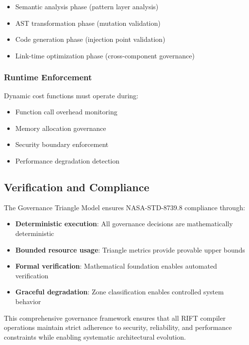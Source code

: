 \begin{itemize}
    \item Semantic analysis phase (pattern layer analysis)
    \item AST transformation phase (mutation validation)
    \item Code generation phase (injection point validation)
    \item Link-time optimization phase (cross-component governance)
\end{itemize}

\subsubsection{Runtime Enforcement}

Dynamic cost functions must operate during:

\begin{itemize}
    \item Function call overhead monitoring
    \item Memory allocation governance
    \item Security boundary enforcement
    \item Performance degradation detection
\end{itemize}

\subsection{Verification and Compliance}

The Governance Triangle Model ensures NASA-STD-8739.8 compliance through:

\begin{itemize}
    \item \textbf{Deterministic execution}: All governance decisions are mathematically deterministic
    \item \textbf{Bounded resource usage}: Triangle metrics provide provable upper bounds
    \item \textbf{Formal verification}: Mathematical foundation enables automated verification
    \item \textbf{Graceful degradation}: Zone classification enables controlled system behavior
\end{itemize}

This comprehensive governance framework ensures that all RIFT compiler operations maintain strict adherence to security, reliability, and performance constraints while enabling systematic architectural evolution.

